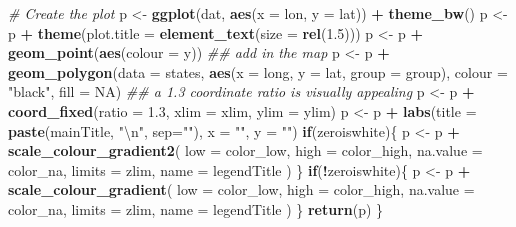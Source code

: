 \documentclass[]{book}
\newenvironment{Shaded}{\begin{snugshade}}{\end{snugshade}}
\newcommand{\CharTok}[1]{\textcolor[rgb]{0.31,0.60,0.02}{#1}}
\newcommand{\CommentTok}[1]{\textcolor[rgb]{0.56,0.35,0.01}{\textit{#1}}}
\newcommand{\ControlFlowTok}[1]{\textcolor[rgb]{0.13,0.29,0.53}{\textbf{#1}}}
\newcommand{\DataTypeTok}[1]{\textcolor[rgb]{0.13,0.29,0.53}{#1}}
\newcommand{\FloatTok}[1]{\textcolor[rgb]{0.00,0.00,0.81}{#1}}
\newcommand{\KeywordTok}[1]{\textcolor[rgb]{0.13,0.29,0.53}{\textbf{#1}}}
\newcommand{\NormalTok}[1]{#1}
\newcommand{\OperatorTok}[1]{\textcolor[rgb]{0.81,0.36,0.00}{\textbf{#1}}}
\newcommand{\OtherTok}[1]{\textcolor[rgb]{0.56,0.35,0.01}{#1}}
\newcommand{\StringTok}[1]{\textcolor[rgb]{0.31,0.60,0.02}{#1}}
\begin{document}
\begin{Shaded}
\begin{Highlighting}[]
    \CommentTok{# Create the plot}
\NormalTok{    p <-}\StringTok{ }\KeywordTok{ggplot}\NormalTok{(dat, }\KeywordTok{aes}\NormalTok{(}\DataTypeTok{x =}\NormalTok{ lon, }\DataTypeTok{y =}\NormalTok{ lat)) }\OperatorTok{+}
\StringTok{        }\KeywordTok{theme_bw}\NormalTok{()}
\NormalTok{    p <-}\StringTok{ }\NormalTok{p }\OperatorTok{+}\StringTok{ }\KeywordTok{theme}\NormalTok{(}\DataTypeTok{plot.title =} \KeywordTok{element_text}\NormalTok{(}\DataTypeTok{size =} \KeywordTok{rel}\NormalTok{(}\FloatTok{1.5}\NormalTok{)))}
\NormalTok{    p <-}\StringTok{ }\NormalTok{p }\OperatorTok{+}\StringTok{ }\KeywordTok{geom_point}\NormalTok{(}\KeywordTok{aes}\NormalTok{(}\DataTypeTok{colour =}\NormalTok{ y))}
    \CommentTok{## add in the map}
\NormalTok{    p <-}\StringTok{ }\NormalTok{p }\OperatorTok{+}\StringTok{ }\KeywordTok{geom_polygon}\NormalTok{(}\DataTypeTok{data =}\NormalTok{ states, }\KeywordTok{aes}\NormalTok{(}\DataTypeTok{x =}\NormalTok{ long, }\DataTypeTok{y =}\NormalTok{ lat, }\DataTypeTok{group =}\NormalTok{ group), }
                          \DataTypeTok{colour =} \StringTok{"black"}\NormalTok{, }\DataTypeTok{fill =} \OtherTok{NA}\NormalTok{) }
    \CommentTok{## a 1.3 coordinate ratio is visually appealing}
\NormalTok{    p <-}\StringTok{ }\NormalTok{p }\OperatorTok{+}\StringTok{ }\KeywordTok{coord_fixed}\NormalTok{(}\DataTypeTok{ratio =} \FloatTok{1.3}\NormalTok{, }\DataTypeTok{xlim =}\NormalTok{ xlim, }\DataTypeTok{ylim =}\NormalTok{ ylim)}
\NormalTok{    p <-}\StringTok{ }\NormalTok{p }\OperatorTok{+}\StringTok{ }\KeywordTok{labs}\NormalTok{(}\DataTypeTok{title =} \KeywordTok{paste}\NormalTok{(mainTitle, }\StringTok{"}\CharTok{\textbackslash{}n}\StringTok{"}\NormalTok{, }\DataTypeTok{sep=}\StringTok{""}\NormalTok{), }\DataTypeTok{x =} \StringTok{""}\NormalTok{, }\DataTypeTok{y =} \StringTok{""}\NormalTok{)}
    \ControlFlowTok{if}\NormalTok{(zeroiswhite)\{}
\NormalTok{        p <-}\StringTok{ }\NormalTok{p }\OperatorTok{+}\StringTok{ }\KeywordTok{scale_colour_gradient2}\NormalTok{(}
            \DataTypeTok{low      =}\NormalTok{  color_low, }
            \DataTypeTok{high     =}\NormalTok{ color_high,}
            \DataTypeTok{na.value =}\NormalTok{ color_na,}
            \DataTypeTok{limits   =}\NormalTok{ zlim,}
            \DataTypeTok{name     =}\NormalTok{ legendTitle}
\NormalTok{        ) }
\NormalTok{    \}}
    \ControlFlowTok{if}\NormalTok{(}\OperatorTok{!}\NormalTok{zeroiswhite)\{}
\NormalTok{        p <-}\StringTok{ }\NormalTok{p }\OperatorTok{+}\StringTok{ }\KeywordTok{scale_colour_gradient}\NormalTok{(}
            \DataTypeTok{low      =}\NormalTok{ color_low, }
            \DataTypeTok{high     =}\NormalTok{ color_high,}
            \DataTypeTok{na.value =}\NormalTok{ color_na,}
            \DataTypeTok{limits   =}\NormalTok{ zlim,}
            \DataTypeTok{name     =}\NormalTok{ legendTitle}
\NormalTok{        ) }
\NormalTok{    \}}
    \KeywordTok{return}\NormalTok{(p)  }
\NormalTok{\}}
\end{Highlighting}
\end{Shaded}
\end{document}
